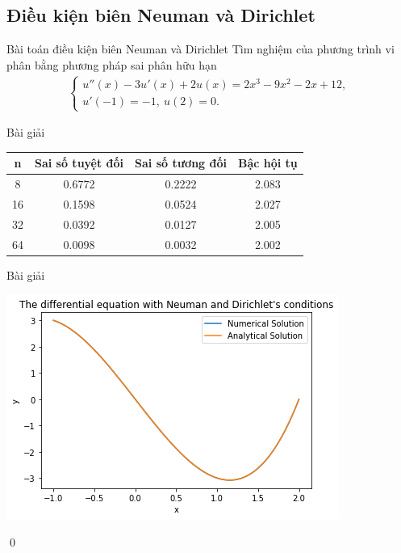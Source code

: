 \documentclass[9pt]{beamer}
\numberwithin{equation}{section}
\begin{document}
\subsection{Điều kiện biên Neuman và Dirichlet}

\begin{frame}
\begin{block}{Bài toán điều kiện biên Neuman và Dirichlet}
    Tìm nghiệm của phương trình vi phân bằng phương pháp sai phân hữu hạn
    \begin{align*}
    \begin{cases}
        u''(x) - 3u'(x) + 2u(x) = 2x^3 - 9x^2 - 2x + 12, \\
        u'(-1) = -1, \ u(2) = 0.
    \end{cases}
    \end{align*}
\end{block}

\begin{exampleblock}{Bài giải}
    \begin{center}\begin{tabular}{||c|c|c|c||}
    \hline
    n & Sai số tuyệt đối & Sai số tương đối & Bậc hội tụ \\
    \hline\hline
    8   & 0.6772 & 0.2222 & 2.083 \\
    16  & 0.1598 & 0.0524 & 2.027 \\
    32  & 0.0392 & 0.0127 & 2.005 \\
    64  & 0.0098 & 0.0032 & 2.002 \\
    \hline
    \end{tabular}\end{center}
\end{exampleblock}
\end{frame}

\begin{frame}
\begin{exampleblock}{Bài giải}
    \begin{center}
        \includegraphics[scale=0.5]{img/midterm2}
    \end{center}
    \qed
\end{exampleblock} 
\end{frame}
\end{document}
